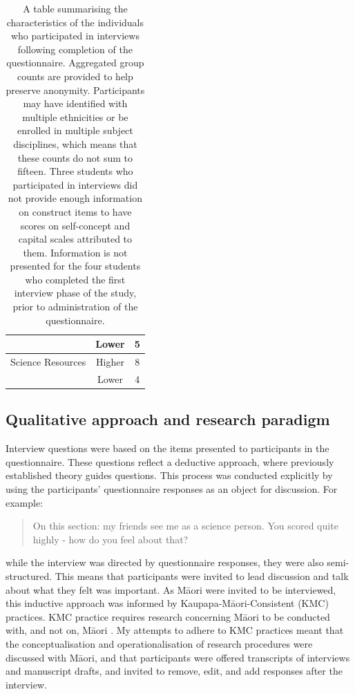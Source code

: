 \begin{table}[ht]
\begin{tabular}{cc|c}
                       & Lower                    & 5     \\ \hline
Science Resources      & Higher                   & 8     \\
                       & Lower                    & 4    
\end{tabular}
\caption{\label{tab:Demographics} A table summarising the characteristics of the individuals who participated in interviews following completion of the questionnaire. Aggregated group counts are provided to help preserve anonymity. Participants may have identified with multiple ethnicities or be enrolled in multiple subject disciplines, which means that these counts do not sum to fifteen. Three students who participated in interviews did not provide enough information on construct items to have scores on self-concept and capital scales attributed to them. Information is not presented for the four students who completed the first interview phase of the study, prior to administration of the questionnaire.}
\end{table}

\subsection{Qualitative approach and research paradigm}
Interview questions were based on the items presented to participants in the questionnaire. These questions reflect a deductive approach, where previously established theory guides questions. This process was conducted explicitly by using the participants' questionnaire responses as an object for discussion. For example: 
\blockquote{On this section: my friends see me as a science person. You scored quite highly - how do you feel about that?} while the interview was directed by questionnaire responses, they were also semi-structured. This means that participants were invited to lead discussion and talk about what they felt was important. As M\={a}ori were invited to be interviewed, this inductive approach was informed by Kaupapa-M\={a}ori-Consistent (KMC) practices. KMC practice requires research concerning M\={a}ori to be conducted with, and not on, M\={a}ori \citep{walker2006exploration}. My attempts to adhere to KMC practices meant that the conceptualisation and operationalisation of research procedures were discussed with M\={a}ori, and that participants were offered transcripts of interviews and manuscript drafts, and invited to remove, edit, and add responses after the  interview.  

